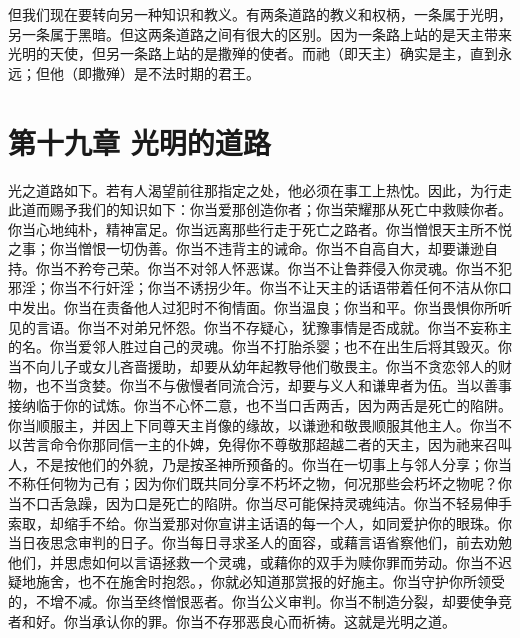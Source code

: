 但我们现在要转向另一种知识和教义。有两条道路的教义和权柄，一条属于光明，另一条属于黑暗。但这两条道路之间有很大的区别。因为一条路上站的是天主带来光明的天使，但另一条路上站的是撒殚的使者。而祂（即天主）确实是主，直到永远；但他（即撒殚）是不法时期的君王。\par


\section{第十九章 光明的道路}

光之道路如下。若有人渴望前往那指定之处，他必须在事工上热忱。因此，为行走此道而赐予我们的知识如下：你当爱那创造你者；你当荣耀那从死亡中救赎你者。你当心地纯朴，精神富足。你当远离那些行走于死亡之路者。你当憎恨天主所不悦之事；你当憎恨一切伪善。你当不违背主的诫命。你当不自高自大，却要谦逊自持。你当不矜夸己荣。你当不对邻人怀恶谋。你当不让鲁莽侵入你灵魂。你当不犯邪淫；你当不行奸淫；你当不诱拐少年。你当不让天主的话语带着任何不洁从你口中发出。你当在责备他人过犯时不徇情面。你当温良；你当和平。你当畏惧你所听见的言语。你当不对弟兄怀怨。你当不存疑心，犹豫事情是否成就。你当不妄称主的名。你当爱邻人胜过自己的灵魂。你当不打胎杀婴；也不在出生后将其毁灭。你当不向儿子或女儿吝啬援助，却要从幼年起教导他们敬畏主。你当不贪恋邻人的财物，也不当贪婪。你当不与傲慢者同流合污，却要与义人和谦卑者为伍。当以善事接纳临于你的试炼。你当不心怀二意，也不当口舌两舌，因为两舌是死亡的陷阱。你当顺服主，并因上下同尊天主肖像的缘故，以谦逊和敬畏顺服其他主人。你当不以苦言命令你那同信一主的仆婢，免得你不尊敬那超越二者的天主，因为祂来召叫人，不是按他们的外貌，乃是按圣神所预备的。你当在一切事上与邻人分享；你当不称任何物为己有；因为你们既共同分享不朽坏之物，何况那些会朽坏之物呢？你当不口舌急躁，因为口是死亡的陷阱。你当尽可能保持灵魂纯洁。你当不轻易伸手索取，却缩手不给。你当爱那对你宣讲主话语的每一个人，如同爱护你的眼珠。你当日夜思念审判的日子。你当每日寻求圣人的面容，或藉言语省察他们，前去劝勉他们，并思虑如何以言语拯救一个灵魂，或藉你的双手为赎你罪而劳动。你当不迟疑地施舍，也不在施舍时抱怨。，你就必知道那赏报的好施主。你当守护你所领受的，不增不减。你当至终憎恨恶者。你当公义审判。你当不制造分裂，却要使争竞者和好。你当承认你的罪。你当不存邪恶良心而祈祷。这就是光明之道。\par


